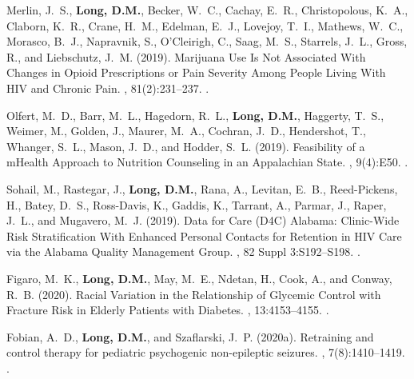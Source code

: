 \begin{thebibliography}{}
Merlin, J.~S., \textbf{Long, D.M.}, Becker, W.~C., Cachay, E.~R., Christopolous, K.~A.,
  Claborn, K.~R., Crane, H.~M., Edelman, E.~J., Lovejoy, T.~I., Mathews, W.~C.,
  Morasco, B.~J., Napravnik, S., O'Cleirigh, C., Saag, M.~S., Starrels, J.~L.,
  Gross, R., and Liebschutz, J.~M. (2019).
\newblock Marijuana {Use} {Is} {Not} {Associated} {With} {Changes} in {Opioid}
  {Prescriptions} or {Pain} {Severity} {Among} {People} {Living} {With} {HIV}
  and {Chronic} {Pain}.
,
  81(2):231--237.
.  


Olfert, M.~D., Barr, M.~L., Hagedorn, R.~L., \textbf{Long, D.M.}, Haggerty, T.~S.,
  Weimer, M., Golden, J., Maurer, M.~A., Cochran, J.~D., Hendershot, T.,
  Whanger, S.~L., Mason, J.~D., and Hodder, S.~L. (2019).
\newblock Feasibility of a {mHealth} {Approach} to {Nutrition} {Counseling} in
  an {Appalachian} {State}.
, 9(4):E50.
.  


Sohail, M., Rastegar, J., \textbf{Long, D.M.}, Rana, A., Levitan, E.~B., Reed-Pickens, H.,
  Batey, D.~S., Ross-Davis, K., Gaddis, K., Tarrant, A., Parmar, J., Raper,
  J.~L., and Mugavero, M.~J. (2019).
\newblock Data for {Care} ({D4C}) {Alabama}: {Clinic}-{Wide} {Risk}
  {Stratification} {With} {Enhanced} {Personal} {Contacts} for {Retention} in
  {HIV} {Care} via the {Alabama} {Quality} {Management} {Group}.
, 82
  Suppl 3:S192--S198.
.   



Figaro, M.~K., \textbf{Long, D.M.}, May, M.~E., Ndetan, H., Cook, A., and Conway, R.~B.
  (2020).
\newblock Racial {Variation} in the {Relationship} of {Glycemic} {Control} with
  {Fracture} {Risk} in {Elderly} {Patients} with {Diabetes}.
,
  13:4153--4155.
.  


Fobian, A.~D., \textbf{Long, D.M.}, and Szaflarski, J.~P. (2020a).
\newblock Retraining and control therapy for pediatric psychogenic
  non-epileptic seizures.
,
  7(8):1410--1419.
.  



\end{thebibliography}
